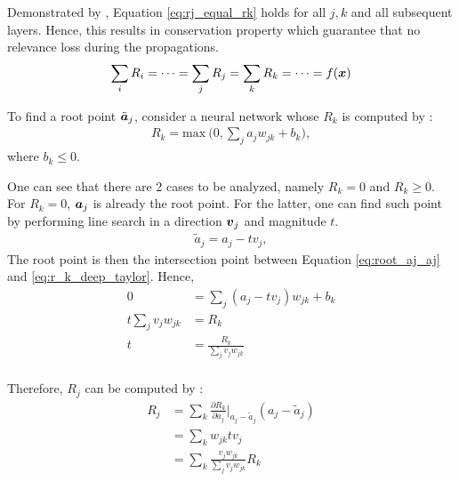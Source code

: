 Demonstrated by \cite{MontavonExplainingnonlinearclassification2017}, Equation \ref{eq:rj_equal_rk} holds for all $j, k$ and all subsequent layers. Hence, this results in  conservation property which guarantee that no relevance loss during the propagations.
\begin{align}
\sum_i 	R_{i} = 	\dots = \sum_j R_{j} = \sum_k R_{k} = \dots =  f(\patvector{x})
\end{align}
 
 

To find a root point $\tilde{\patvector{a}}_j$, consider a neural network whose $R_k$ is computed by :
\begin{align}\label{eq:r_k_deep_taylor}
R_k = \text{max}\ \bigg(0, \sum_{j} a_j w_{jk}  + b_k \bigg),
\end{align}
where $b_k \le 0 $.

One can see that  there are  2 cases to be analyzed, namely $R_k = 0$ and $R_k \ge 0$. For $R_k=0$,  $\patvector{a}_j$ is already the root point. For the latter, one can find such point by performing  line search in  a direction $\patvector{v}_j$ and magnitude $t$.
\begin{align}\label{eq:root_aj_aj}
\tilde{a}_j = a_j - t v_j,
\end{align}
The root point is then the intersection point between Equation \ref{eq:root_aj_aj} and \ref{eq:r_k_deep_taylor}. Hence,
\begin{align}
  0 &= 	\sum_{j} (a_j - t v_j) w_{jk}  + b_k\\
  t \sum_{j} v_j w_{jk} &= R_k \\
  t &= \frac{R_k}{\sum_{j} v_j w_{jk}} \\
\end{align}

Therefore, $R_j$ can be computed by :
\begin{align}
R_j &= \sum_k	\frac{\partial  R_k }{ \partial a_j } \bigg|_{ a_j - \tilde{a}_j }  ( a_j - \tilde{a}_j ) \\
&=	\sum_k w_{jk} tv_j \\
&=	\sum_k \frac{ v_j w_{jk}   }{\sum_{j} v_j w_{jk}}  R_k
\end{align}

